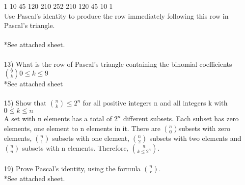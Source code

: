 \documentclass{article}
\begin{document}
\begin{flushleft}
1 10 45 120 210 252 210 120 45 10 1 \\
Use Pascal's identity to produce the row immediately following this row in Pascal's triangle. \\
~\\
*See attached sheet. \\
~\\
\setlength\parindent{0pt}13) What is the row of Pascal's triangle containing the binomial coefficients ${9 \choose k} 0 \leq k \leq 9$ \\
\setlength\parindent{24pt} *See attached sheet \\
~\\
\setlength\parindent{0pt}15) Show that ${n \choose k} \leq 2^n$ for all positive integers n and all integers k with $0 \leq k \leq n$\\
\setlength\parindent{24pt} A set with n elements has a total of $2^n$ different subsets.  Each subset has zero elements, one element to n elements in it.  There are ${n \choose 0} $subsets with zero elements, ${n \choose 1}$ subsets with one element, $n \choose 2$ subsets with two elements and $n \choose n$ subsets with n elements.  Therefore, $n \choose k \leq 2^n$.  \\
~\\
\setlength\parindent{0pt}19) Prove Pascal's identity, using the formula $n \choose r$. \\
\setlength\parindent{24pt}*See attached sheet.

\end{flushleft}
\end{document}

